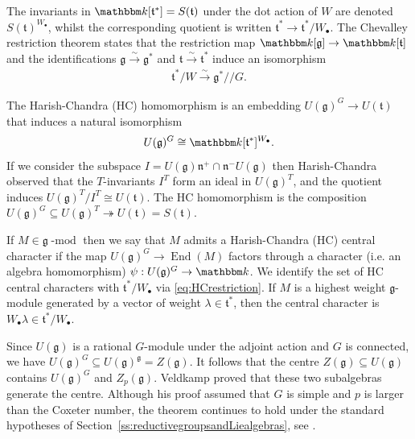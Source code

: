 \documentclass[twoside,12pt,reqno]{amsart}
\theoremstyle{remark}
\numberwithin{equation}{section}
\def\onto{\twoheadrightarrow}
\def\isoto{\overset{\sim}{\longrightarrow}}
\def\k{{\mathbbm k}}
\def\lmod{\!\operatorname{-mod}}
\def\End{\operatorname{End}}
\def\g{{\mathfrak g}}
\def\n{\mathfrak n}
\def\t{\mathfrak t}
\begin{document}
  The invariants in $\k[\t^*] = S(\t)$ under the dot action of $W$ are denoted $S(\t)^{W_\bullet}$, whilst the corresponding quotient is written $\t^* \to \t^* / W_{\bullet}$. The Chevalley restriction theorem \cite[Proposition 7.12]{JanNO} states that the restriction map $\k[\g] \to \k[\t]$ and the identifications $\g\isoto\g^*$ and $\t\isoto \t^*$ induce an isomorphism
  \begin{eqnarray}
  \label{eq:Chevalleyrestriction}
       \t^* / W \isoto \g^* /\!/ G.
  \end{eqnarray}
  
  The Harish-Chandra (HC) homomorphism is an embedding $U(\g)^G \to U(\t)$ that induces a natural isomorphism 
  \begin{eqnarray}
  \label{eq:HCrestriction}
  U(\g)^G \cong \k[\t^*]^{W_\bullet}.    
  \end{eqnarray}
  If we consider the subspace $I = U(\g)\n^+ \cap \n^- U(\g)$ then Harish-Chandra observed that the $T$-invariants $I^T$ form an ideal in $U(\g)^T$, and the quotient induces $U(\g)^T / I^T \cong U(\t)$. The HC homomorphism is the composition $U(\g)^G \subseteq U(\g)^T \onto U(\t) = S(\t)$.

If $M \in \g\lmod$ then we say that $M$ admits a Harish-Chandra (HC) central character if the map $U(\g)^G \to \End(M)$ factors through a character (i.e. an algebra homomorphism) $\psi : U(\g)^G \to \k$. We identify the set of HC central characters with $\t^* / W_\bullet$ via \eqref{eq:HCrestriction}. If $M$ is a highest weight $\g$-module generated by a vector of weight $\lambda \in \t^*$, then the central character is $W_\bullet\lambda \in \t^*/W_\bullet$.



 Since $U(\g)$ is a rational $G$-module under the adjoint action and $G$ is connected, we have $U(\g)^G \subseteq U(\g)^\g = Z(\g)$.  It follows that the centre $Z(\g) \subseteq U(\g)$ contains $U(\g)^G$ and $Z_p(\g)$. Veldkamp proved that these two subalgebras generate the centre. Although his proof assumed that $G$ is simple and $p$ is larger than the Coxeter number, the theorem continues to hold under the standard hypotheses of Section~\ref{ss:reductivegroupsandLiealgebras}, see \cite[]{JaLA}.
\end{document}
